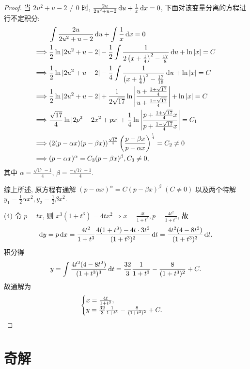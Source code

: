 \begin{proof}
  \textbullet 当 $2u^2+u-2\neq 0$ 时, $\frac{2u}{2u^2+u-2}\mathop{}\!\mathrm{d} u+\frac{1}{x}\mathop{}\!\mathrm{d} x=0$,
  下面对该变量分离的方程进行不定积分:
  \begin{align*}
    & \int\frac{2u}{2u^2+u-2}\mathop{}\!\mathrm{d} u+\int\frac{1}{x}\mathop{}\!\mathrm{d} x=0 \\
    \Longrightarrow{} & \frac{1}{2}\ln|2u^2+u-2|-\frac{1}{2}\int\frac{1}{2\left(x+\frac{1}{4}\right)^2-\frac{17}{8}}\mathop{}\!\mathrm{d} u+\ln|x|=C \\
    \Longrightarrow{} & \frac{1}{2}\ln|2u^2+u-2|-\frac{1}{4}\int\frac{1}{\left(x+\frac{1}{4}\right)^2-\frac{17}{16}}\mathop{}\!\mathrm{d} u+\ln|x|=C \\
    \Longrightarrow{} & \frac{1}{2}\ln|2u^2+u-2|+\frac{1}{2\sqrt{17}}\ln\left|\frac{u+\frac{1+\sqrt{17}}{4}}{u+\frac{1-\sqrt{17}}{4}}\right|+\ln|x|=C \\
    \Longrightarrow{} & \frac{\sqrt{17}}{4}\ln|2p^2-2x^2+px|+\frac{1}{4}\ln\left|\frac{p+\frac{1+\sqrt{17}}{4}x}{p+\frac{1-\sqrt{17}}{4}x}\right|=C_1 \\
    \Longrightarrow{} & (2(p-\alpha x)(p-\beta x))^{\frac{\sqrt{17}}{4}}\left(\frac{p-\beta x}{p-\alpha x}\right)^{\frac{1}{4}}=C_2\neq 0 \\
    \Longrightarrow{} & (p-\alpha x)^{\alpha}=C_3(p-\beta x)^{\beta},C_3\neq 0,
  \end{align*}
  其中 $\alpha=\frac{\sqrt{17}-1}{4}$, $\beta=\frac{-\sqrt{17}-1}{4}$.

  综上所述, 原方程有通解 $(p-\alpha x)^{\alpha}=C(p-\beta x)^{\beta}$ $(C\neq 0)$
  以及两个特解 $y_1=\frac{1}{2}\alpha x^2,y_2=\frac{1}{2}\beta x^2$.

  (4) 令 $p=tx$, 则 $x^3(1+t^3)=4tx^2\Rightarrow x=\frac{4t}{1+t^3},p=\frac{4t^2}{1+t^3}$, 故
  \[\mathop{}\!\mathrm{d} y=p\mathop{}\!\mathrm{d} x=\frac{4t^2}{1+t^3}\frac{4(1+t^3)-4t\cdot3t^2}{(1+t^3)^2}\mathop{}\!\mathrm{d} t
    = \frac{4t^2(4-8t^2)}{(1+t^3)^3}\mathop{}\!\mathrm{d} t.\]
  积分得
  \[y=\int\frac{4t^2(4-8t^2)}{(1+t^3)^3}\mathop{}\!\mathrm{d} t=\frac{32}{3}\frac{1}{1+t^3}-\frac{8}{(1+t^3)^2}+C.\]
  故通解为
  \[\begin{cases}
    x=\frac{4t}{1+t^3}, \\
    y=\frac{32}{3}\frac{1}{1+t^3}-\frac{8}{(1+t^3)^2}+C.
  \end{cases}\qedhere\]
\end{proof}



\section{奇解}



